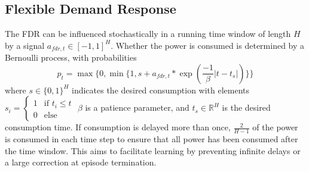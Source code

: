\subsection{Flexible Demand Response}
The FDR can be influenced stochastically in a running time window of length $H$ by a signal $a_{fdr, t} \in [-1 , 1]^H$. Whether the power is consumed is determined by a Bernoulli process, with probabilities
\begin{equation}
    p_t = \max\{0, \min\{1, s + a_{fdr, t} * \exp(\frac{-1}{\beta}|t - t_{s}|)\}\}
\end{equation}
where $s \in \{0,1\}^{H}$ indicates the desired consumption with elements $s_i = \begin{cases}
    1 & \text{if } t_i \leq t \\
    0 & \text{else}
\end{cases}$ $\beta$ is a patience parameter, and $t_{s} \in \mathbb{R}^{H}$ is the desired consumption time. If consumption is delayed more than once, $\frac{2}{H-1}$ of the power is consumed in each time step to ensure that all power has been consumed after the time window. This aims to facilitate learning by preventing infinite delays or a large correction at episode termination.

